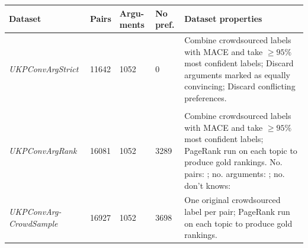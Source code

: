 \begin{table}
  \begin{tabularx}{\textwidth}{ p{3cm} | p{1cm} p{1cm} p{1cm} X }
  Dataset & Pairs & Argu-ments & No pref. & Dataset properties \\\hline
  \emph{UKPConvArgStrict} &
  11642 &
  1052 & 
  0 &
  Combine crowdsourced labels with MACE and take $\ge 95\%$ most confident labels; \newline
  Discard arguments marked as equally convincing; \newline
  Discard conflicting preferences. \newline
  \\
  \\      
  \emph{UKPConvArgRank} &
  16081 &
  1052 &
  3289 &
  Combine crowdsourced labels with MACE and take $\ge 95\%$ most confident labels;  \newline
  PageRank run on each topic to produce gold rankings.
  \newline
  No. pairs: ; no. arguments: ; no. don't knows: 
  \\  
  \emph{UKPConvArg-CrowdSample} &
  16927 & 
  1052 &
  3698 &
  One original crowdsourced label per pair;\newline
  PageRank run on each topic to produce gold rankings.
  

\end{tabularx}
\end{table}
